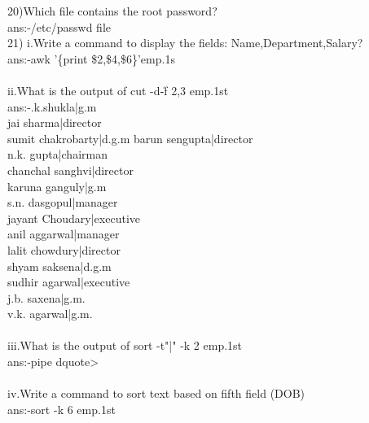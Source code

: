 \documentclass{article}
\begin{document}
{20)Which file contains the root password?\\
ans:-/etc/passwd file\\
21)
i.Write a command to display the fields:
Name,Department,Salary?\\
ans:-awk '\{print \$2,\$4,\$6\}'emp.1s\\
\\
ii.What is the output of cut -d\| -f 2,3 emp.1st\\
ans:-.k.shukla|g.m\\
jai sharma|director\\
sumit chakrobarty|d.g.m
barun sengupta|director\\
n.k. gupta|chairman\\
chanchal sanghvi|director\\
karuna ganguly|g.m\\
s.n. dasgopul|manager\\
jayant Choudary|executive\\
anil aggarwal|manager\\
lalit chowdury|director\\
shyam saksena|d.g.m\\
sudhir agarwal|executive\\
j.b. saxena|g.m.\\
v.k. agarwal|g.m.\\
\\
iii.What is the output of sort -t"|" -k 2 emp.1st\\
ans:-pipe dquote>\\
\\
iv.Write a command to sort text based on fifth field (DOB)\\
ans:-sort -k 6 emp.1st\\
}
\end{document}
